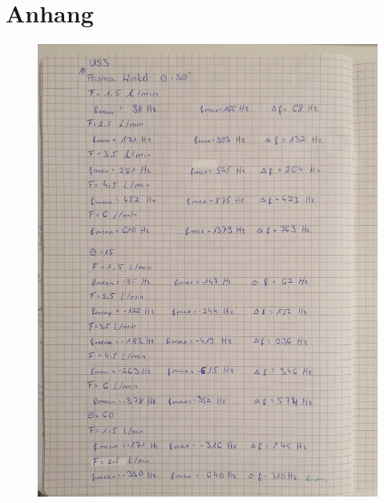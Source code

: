 \section*{Anhang}

\begin{figure}
    \centering
    \includegraphics[width=\textwidth]{content/Anhang1.jpg}
\end{figure}
    
